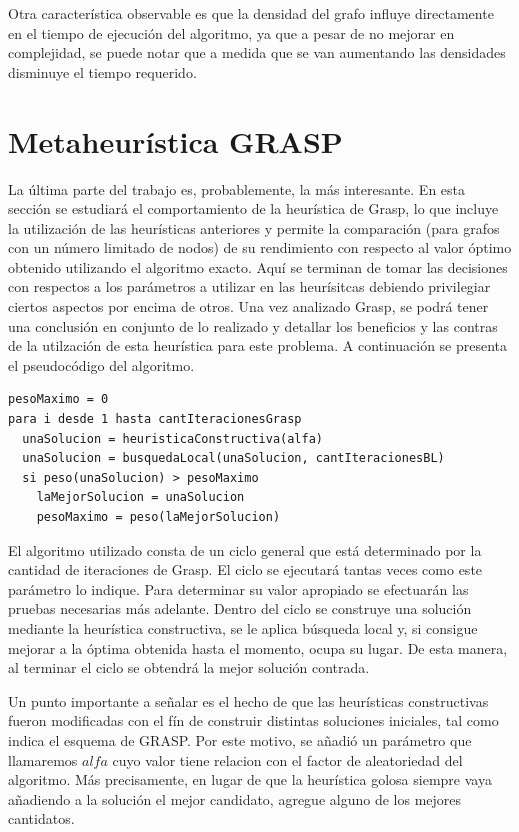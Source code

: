 \documentclass[a4paper,11pt] {article}
\begin{document}
Otra característica observable es que la densidad del grafo influye directamente en el tiempo de ejecución del algoritmo, ya que a pesar de no mejorar en complejidad, se puede notar que a medida que se van aumentando las 
densidades disminuye el tiempo requerido. 

\section{Metaheur\'istica GRASP}

La última parte del trabajo es, probablemente, la más interesante. En esta sección se estudiará el comportamiento de la heurística de Grasp, lo que incluye la utilización de las heurísticas anteriores y permite la comparación (para grafos con un número limitado de nodos) de su rendimiento con respecto al valor óptimo obtenido utilizando el algoritmo exacto. Aquí se terminan de tomar las decisiones con respectos a los parámetros a utilizar en las heurísitcas debiendo privilegiar ciertos aspectos por encima de otros. Una vez analizado Grasp, se podrá tener una conclusión en conjunto de lo realizado y detallar los beneficios y las contras de la utilzación de esta heurística para este problema.
A continuación se presenta el pseudocódigo del algoritmo.

\begin{verbatim}
pesoMaximo = 0
para i desde 1 hasta cantIteracionesGrasp
  unaSolucion = heuristicaConstructiva(alfa)
  unaSolucion = busquedaLocal(unaSolucion, cantIteracionesBL)
  si peso(unaSolucion) > pesoMaximo
    laMejorSolucion = unaSolucion
    pesoMaximo = peso(laMejorSolucion)
\end{verbatim}

El algoritmo utilizado consta de un ciclo general que está determinado por la cantidad de iteraciones de Grasp. El ciclo se ejecutará tantas veces como este parámetro lo indique. Para determinar su valor apropiado se efectuarán las pruebas necesarias más adelante. Dentro del ciclo se construye una solución mediante la heurística constructiva, se le aplica búsqueda local y, si consigue mejorar a la óptima obtenida hasta el momento, ocupa su lugar. De esta manera, al terminar el ciclo se obtendrá la mejor solución contrada.

Un punto importante a señalar es el hecho de que las heurísticas constructivas fueron modificadas con el fín de construir distintas soluciones iniciales, tal como indica el esquema de GRASP. Por este motivo, se añadió un parámetro que llamaremos $alfa$ cuyo valor tiene relacion con el factor de aleatoriedad del algoritmo. Más precisamente, en lugar de que la heurística golosa siempre vaya añadiendo a la solución el mejor candidato, agregue alguno de los mejores cantidatos.
\end{document}
